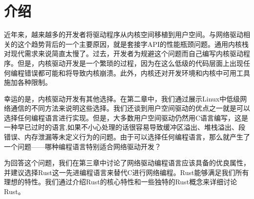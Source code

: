 
\chapter{介绍}

近年来，越来越多的开发者将驱动程序从内核空间移植到用户空间。与网络驱动相关的这个趋势背后的一个主要原因，就是套接字API的性能瓶颈问题。通用内核栈对现代需求来说简直太慢了。过去，开发者为规避这个问题而自己编写内核驱动程序。但是，内核驱动开发是一个繁琐的过程，因为在这么低级的代码层面上出现任何编程错误都可能和将导致内核崩溃。此外，内核还对开发环境和内核中可用工具施加各种限制。

幸运的是，内核驱动开发有其他选择。在第二章中，我们通过展示Linux中低级网络通信的不同方法来说明这些选择。我们还谈到用户空间驱动的优点之一就是可以选择任何编程语言进行实现。但是，大多数用户空间驱动仍然用C语言编写，这是一种早已过时的语言,如果不小心处理的话很容易导致缓冲区溢出、堆栈溢出、段错误、内存泄漏等未定义行为的问题。由于可以选择任何编程语言，那么就产生了一个问题——哪种编程语言特别适合网络驱动开发？

为回答这个问题，我们在第三章中讨论了网络驱动编程语言应该具备的优良属性，并建议选择Rust这一先进编程语言来替代C进行网络编程。Rust能够满足我们所有理想的特性。我们通过介绍Rust的核心特性和一些独特的Rust概念来详细讨论Rust。